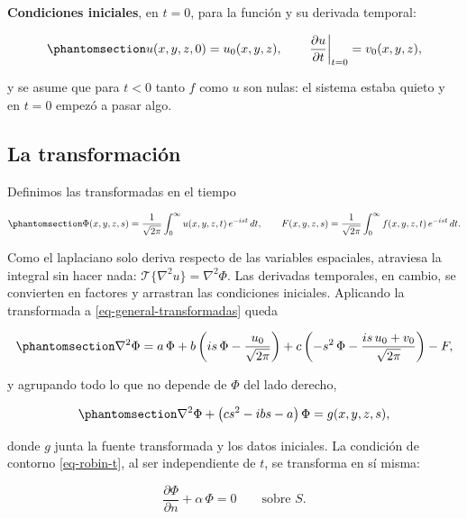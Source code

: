 \documentclass[
  spanish,
  a4paper,
]{scrbook}
\theoremstyle{definition}
\theoremstyle{plain}
\theoremstyle{definition}
\theoremstyle{plain}
\theoremstyle{definition}
\theoremstyle{remark}
\begin{document}
\textbf{Condiciones iniciales}, en \(t=0\), para la función y su
derivada temporal:

\begin{equation}\protect\phantomsection\label{eq-iniciales-t}{
u(x,y,z,0) = u_0(x,y,z), \qquad
\left.\frac{\partial u}{\partial t}\right|_{t=0} = v_0(x,y,z) ,
}\end{equation}

y se asume que para \(t<0\) tanto \(f\) como \(u\) son nulas: el sistema
estaba quieto y en \(t=0\) empezó a pasar algo.

\subsection{La transformación}\label{sec-transformar}

Definimos las transformadas en el tiempo

\begin{equation}\protect\phantomsection\label{eq-def-transformadas}{
\Phi(x,y,z,s) = \frac{1}{\sqrt{2\pi}}\int_0^{\infty} u(x,y,z,t)\,e^{-ist}\,dt, \qquad
F(x,y,z,s) = \frac{1}{\sqrt{2\pi}}\int_0^{\infty} f(x,y,z,t)\,e^{-ist}\,dt .
}\end{equation}

Como el laplaciano solo deriva respecto de las variables espaciales,
atraviesa la integral sin hacer nada:
\(\mathcal{T}\{\nabla^2u\} = \nabla^2\Phi\). Las derivadas temporales,
en cambio, se convierten en factores y arrastran las condiciones
iniciales. Aplicando la transformada a \ref{eq-general-transformadas}
queda

\begin{equation}\protect\phantomsection\label{eq-transformada-general}{
\nabla^2\Phi = a\,\Phi + b\left(is\,\Phi - \frac{u_0}{\sqrt{2\pi}}\right)
+ c\left(-s^2\,\Phi - \frac{is\,u_0 + v_0}{\sqrt{2\pi}}\right) - F ,
}\end{equation}

y agrupando todo lo que no depende de \(\Phi\) del lado derecho,

\begin{equation}\protect\phantomsection\label{eq-helmholtz-generado}{
\nabla^2\Phi + \big(cs^2 - ibs - a\big)\,\Phi = g(x,y,z,s) ,
}\end{equation}

donde \(g\) junta la fuente transformada y los datos iniciales. La
condición de contorno \ref{eq-robin-t}, al ser independiente de \(t\),
se transforma en sí misma:

\[
\frac{\partial\Phi}{\partial n} + \alpha\,\Phi = 0 \qquad\text{sobre } S .
\]
\end{document}
